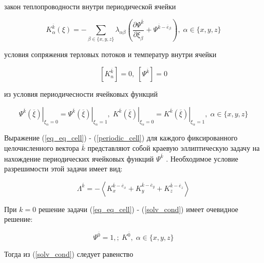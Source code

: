закон теплопроводности внутри периодической ячейки

\begin{equation}
    K^{ \overline{k}}_{\alpha} \left( \xi \right) = 
    - \sum_{\beta \in \{x,y,z\}} \lambda_{\alpha\beta} 
    \left(  \frac{\partial \Psi^{ \overline{k}}}{\partial \xi_{\beta}} + \Psi^{ \overline{k} - \overline{e}_{\beta}}\right)
    , \; \alpha \in \{x,y,z\}
\end{equation}

условия сопряжения терловых потоков и температур внутри ячейки

\begin{equation}
    \left[  K^{ \overline{k}}_n \right] = 0, \; \left[  \Psi^{ \overline{k}}\right] = 0
\end{equation}

из условия периодичесности ячейковых функций

\begin{equation}
    \label{periodic_cell}
    \left. \Psi^{ \overline{k}} \left( \overline{\xi} \right) \right|_{\xi_{\alpha}=0} =
    \left. \Psi^{ \overline{k}} \left( \overline{\xi} \right) \right|_{\xi_{\alpha}=1}, \;
    \left. K^{ \overline{k}} \left( \overline{\xi} \right) \right|_{\xi_{\alpha}=0} =
    \left. K^{ \overline{k}} \left( \overline{\xi} \right) \right|_{\xi_{\alpha}=1}
    , \; \alpha \in \{x,y,z\}
\end{equation}

Выражение 
(\ref{eq_eq_cell})
-
(\ref{periodic_cell})
для каждого фиксированного целочисленного вектора 
$ \overline{k} $
представляют собой краевую эллиптическую задачу на нахождение 
периодических ячейковых функций 
$ \Psi^{ \overline{k}} $
. Необходимое условие разрешимости этой задачи имеет вид:

\begin{equation}
    \label{solv_cond}
    \Lambda^{ \overline{k}} = - \left< K^{ \overline{k} - \overline{e}_x}_x + K^{ \overline{k} - \overline{e}_y}_y + K^{ \overline{k} - \overline{e}_z}_z \right> 
\end{equation}

При 
$k=0$
решение задачи 
(\ref{eq_eq_cell})
-
(\ref{solv_cond})
имеет очевидное решение:

\begin{equation}
    \label{psi_one}
    \Psi^{ \overline{0}} = 1, ;\ K^{ \overline{0}}
    , \; \alpha \in \{x,y,z\}
\end{equation}

Тогда из 
(\ref{solv_cond})
следует равенство


